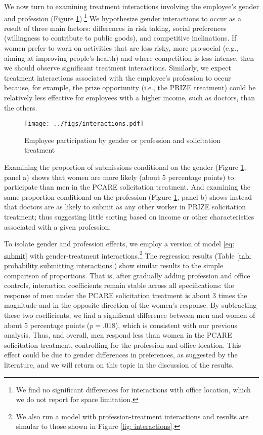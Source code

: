 \documentclass[12pt, titlepage]{article}
\begin{document}
We now turn to examining treatment interactions involving the employee's
gender and profession (Figure \ref{interactions}).\footnote{We find no
  significant differences for interactions with office location, which
  we do not report for space limitation.} We hypothesize gender
interactions to occur as a result of three main factors: differences in
risk taking, social preferences (willingness to contribute to public
goods), and competitive inclinations. If women prefer to work on
activities that are less risky, more pro-social (e.g., aiming at
improving people's health) and where competition is less intense, then
we should observe significant treatment interactions. Similarly, we
expect treatment interactions associated with the employee's profession
to occur because, for example, the prize opportunity (i.e., the PRIZE
treatment) could be relatively less effective for employees with a
higher income, such as doctors, than the others.

\begin{figure} 
\caption{Employee participation by gender or profession and solicitation treatment}
  \label{interactions}
  \centering
  \texttt{[image: ../figs/interactions.pdf]}
\end{figure}

Examining the proportion of submissions conditional on the gender
(Figure \ref{interactions}, panel a) shows that women are more likely
(about 5 percentage points) to participate than men in the PCARE
solicitation treatment. And examining the same proportion conditional on
the profession (Figure \ref{interactions}, panel b) shows instead that
doctors are as likely to submit as any other worker in PRIZE
solicitation treatment; thus suggesting little sorting based on income
or other characteristics associated with a given profession.



To isolate gender and profession effects, we employ a version of model
\eqref{eq: submit} with gender-treatment interactions.\footnote{We also
  run a model with profession-treatment interactions and results are
  simular to those shown in Figure \ref{fig: interactions}.} The
regression results (Table
\ref{tab: probability submitting interactions}) show similar results to
the simple comparison of proportions. That is, after gradually adding
profession and office controls, interaction coefficients remain stable
across all specifications: the response of men under the PCARE
solicitation treatment is about 3 times the magnitude and in the
opposite direction of the women's response. By subtracting these two
coefficients, we find a significant difference between men and women of
about 5 percentage points (\(p=.018\)), which is consistent with our
previous analysis. Thus, and overall, men respond less than women in the
PCARE solicitation treatment, controlling for the profession and office
location. This effect could be due to gender differences in preferences,
as suggested by the literature, and we will return on this topic in the
discussion of the results.
\end{document}

